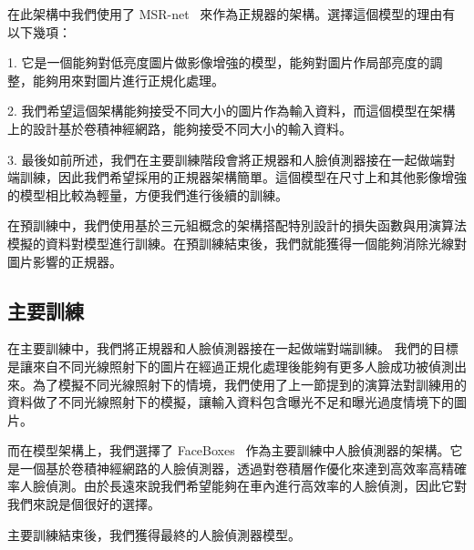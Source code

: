在此架構中我們使用了 MSR-net~\cite{shen2017msr} 來作為正規器的架構。選擇這個模型的理由有以下幾項：

1. 它是一個能夠對低亮度圖片做影像增強的模型，能夠對圖片作局部亮度的調整，能夠用來對圖片進行正規化處理。

2. 我們希望這個架構能夠接受不同大小的圖片作為輸入資料，而這個模型在架構上的設計基於卷積神經網路，能夠接受不同大小的輸入資料。

3. 最後如前所述，我們在主要訓練階段會將正規器和人臉偵測器接在一起做端對端訓練，因此我們希望採用的正規器架構簡單。這個模型在尺寸上和其他影像增強的模型相比較為輕量，方便我們進行後續的訓練。

在預訓練中，我們使用基於三元組概念的架構搭配特別設計的損失函數與用演算法模擬的資料對模型進行訓練。在預訓練結束後，我們就能獲得一個能夠消除光線對圖片影響的正規器。

\subsection{主要訓練}

在主要訓練中，我們將正規器和人臉偵測器接在一起做端對端訓練。
我們的目標是讓來自不同光線照射下的圖片在經過正規化處理後能夠有更多人臉成功被偵測出來。為了模擬不同光線照射下的情境，我們使用了上一節提到的演算法對訓練用的資料做了不同光線照射下的模擬，讓輸入資料包含曝光不足和曝光過度情境下的圖片。

而在模型架構上，我們選擇了 FaceBoxes~\cite{zhang2017faceboxes} 作為主要訓練中人臉偵測器的架構。它是一個基於卷積神經網路的人臉偵測器，透過對卷積層作優化來達到高效率高精確率人臉偵測。由於長遠來說我們希望能夠在車內進行高效率的人臉偵測，因此它對我們來說是個很好的選擇。

主要訓練結束後，我們獲得最終的人臉偵測器模型。